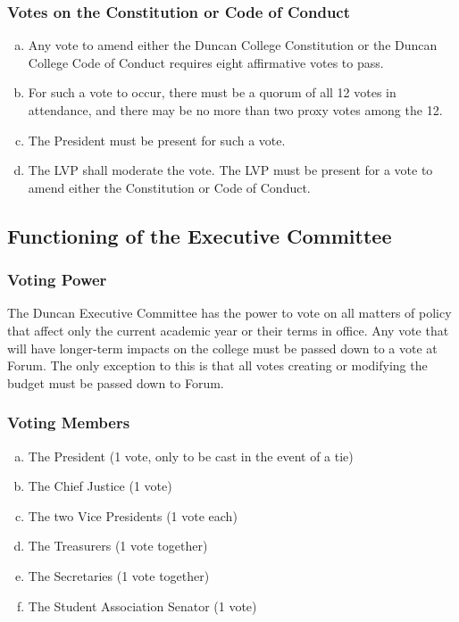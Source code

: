 \documentclass[USletter,12pt]{article}
\begin{document}
\begin{enumerate}[(a)]
\subsubsection{Votes on the Constitution or Code of Conduct}
\begin{enumerate}[(a)]
\item Any vote to amend either the Duncan College Constitution or the Duncan College Code of Conduct requires eight affirmative votes to pass.
\item For such a vote to occur, there must be a quorum of all 12 votes in attendance, and there may be no more than two proxy votes among the 12.
\item The President must be present for such a vote.
\item The LVP shall moderate the vote.  The LVP must be present for a vote to amend either the Constitution or Code of Conduct.
\end{enumerate}


\subsection{Functioning of the Executive Committee}


\subsubsection{Voting Power}
The Duncan Executive Committee has the power to vote on all matters of policy that affect only the current academic year or their terms in office. Any vote that will have longer-term impacts on the college must be passed down to a vote at Forum.  The only exception to this is that all votes creating or modifying the budget must be passed down to Forum.

\subsubsection{Voting Members}
\begin{enumerate}[(a)]
\item The President (1 vote, only to be cast in the event of a tie)
\item The Chief Justice (1 vote)
\item The two Vice Presidents (1 vote each)
\item The Treasurers (1 vote together)
\item The Secretaries (1 vote together)
\item The Student Association Senator (1 vote)
\end{enumerate}


\end{enumerate}
\end{document}
